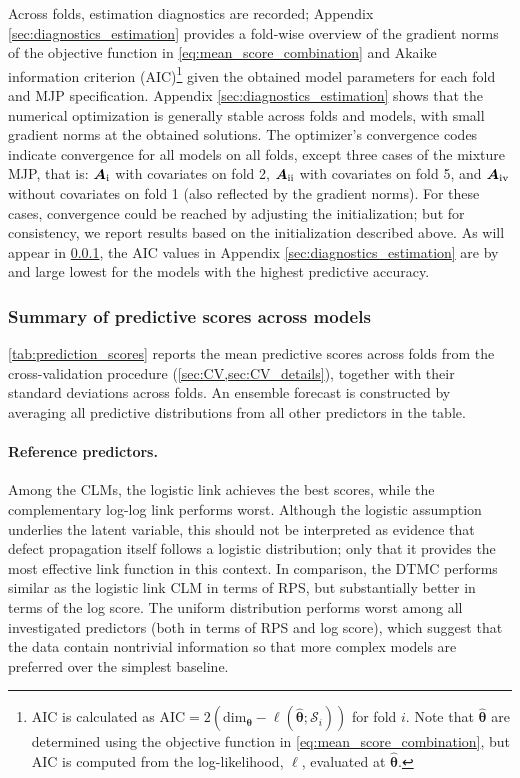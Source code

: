 \documentclass{article}
\newcommand{\RN}[1]{\textup{\uppercase\expandafter{\romannumeral#1}}}
\begin{document}
Across folds, estimation diagnostics are recorded; Appendix \ref{sec:diagnostics_estimation} provides a fold-wise overview of the gradient norms of the objective function in \cref{eq:mean_score_combination} and Akaike information criterion (AIC)\footnote{AIC is calculated as $\text{AIC} = 2 (\text{dim}_{\bm \theta} - \ell (\widehat{\bm \theta}  ; \mathcal{S}_i) )$ for fold $i$. Note that $\widehat{\bm \theta}$ are determined using the objective function in \cref{eq:mean_score_combination}, but AIC is computed from the log-likelihood, $\ell$, evaluated at $\widehat{\bm\theta}$.} given the obtained model parameters for each fold and MJP specification.
Appendix \ref{sec:diagnostics_estimation} shows that the numerical optimization is generally stable across folds and models, with small gradient norms at the obtained solutions. The optimizer’s convergence codes indicate convergence for all models on all folds, except three cases of the mixture MJP, that is: \(\bm{A}_{\RN{1}}\) with covariates on fold 2, \(\bm{A}_{\RN{2}}\) with covariates on fold 5, and \(\bm{A}_{\RN{4}}\) without covariates on fold 1 (also reflected by the gradient norms). For these cases, convergence could be reached by adjusting the initialization; but for consistency, we report results based on the initialization described above. As will appear in \cref{sec:prediction_scores_tables}, the AIC values in Appendix \ref{sec:diagnostics_estimation} are by and large lowest for the models with the highest predictive accuracy.


\subsubsection{Summary of predictive scores across models} \label{sec:prediction_scores_tables}
\cref{tab:prediction_scores} reports the mean predictive scores across folds from the cross-validation procedure (\cref{sec:CV,sec:CV_details}), together with their standard deviations across folds.
An ensemble forecast is constructed by averaging all predictive distributions from all other predictors in the table.




\paragraph{Reference predictors.}
Among the CLMs, the logistic link achieves the best scores, while the complementary log-log link performs worst. Although the logistic assumption underlies the latent variable, this should not be interpreted as evidence that defect propagation itself follows a logistic distribution; only that it provides the most effective link function in this context. 
In comparison, the DTMC performs similar as the logistic link CLM in terms of RPS, but substantially better in terms of the log score.
The uniform distribution performs worst among all investigated predictors (both in terms of RPS and log score), which suggest that the data contain nontrivial information so that more complex models are preferred over the simplest baseline. 
\end{document}

